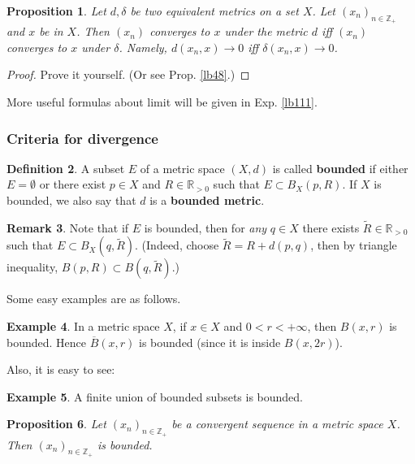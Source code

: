 \documentclass[12pt,b5paper,notitlepage]{article}
\theoremstyle{definition}
\newtheorem{df}{Definition}[section]
\newtheorem{eg}[df]{Example}
\newtheorem{rem}[df]{Remark}
\theoremstyle{plain}
\newtheorem{pp}[df]{Proposition}
\newcommand{\wtd}{\widetilde}
\newcommand{\ovl}{\overline}
\newcommand{\Zbb}{\mathbb Z}
\newcommand{\Rbb}{\mathbb R}
\numberwithin{equation}{section}
\begin{document}
\begin{pp}
Let $d,\delta$ be two equivalent metrics on a set $X$. Let $(x_n)_{n\in\Zbb_+}$ and $x$ be in $X$. Then $(x_n)$ converges to $x$ under the metric $d$ iff  $(x_n)$ converges to $x$ under $\delta$. Namely, $d(x_n,x)\rightarrow 0$ iff $\delta(x_n,x)\rightarrow 0$.
\end{pp}

\begin{proof}
Prove it yourself. (Or see Prop. \ref{lb48}.)
\end{proof}

More useful formulas about limit will be given in Exp. \ref{lb111}.







\subsubsection{Criteria for divergence}\label{lb119}

\begin{df}
A subset $E$ of a metric space $(X,d)$ is called  \textbf{bounded} if either $E=\emptyset$ or there exist $p\in X$ and $R\in\Rbb_{>0}$ such that $E\subset B_X(p,R)$. If $X$ is bounded, we also say that $d$ is a \textbf{bounded metric}. 
\end{df}

\begin{rem}
Note that if $E$ is bounded, then  for \textit{any} $q\in X$ there exists $\wtd R\in\Rbb_{>0}$ such that $E\subset B_X(q,\wtd R)$. (Indeed, choose $\wtd R=R+d(p,q)$, then by triangle inequality, $B(p,R)\subset B(q,\wtd R)$.)
\end{rem}

Some easy examples are as follows.
\begin{eg}
In a metric space $X$, if $x\in X$ and $0<r<+\infty$, then $B(x,r)$ is bounded. Hence $\ovl B(x,r)$ is bounded (since it is inside $B(x,2r)$).
\end{eg}



Also, it is easy to see:
\begin{eg}\label{lb22}
A finite union of bounded subsets is bounded.
\end{eg}

\begin{pp}\label{lb24}
Let $(x_n)_{n\in\Zbb_+}$ be a convergent sequence in a metric space $X$. Then $(x_n)_{n\in\Zbb_+}$ is bounded.
\end{pp}
\end{document}
